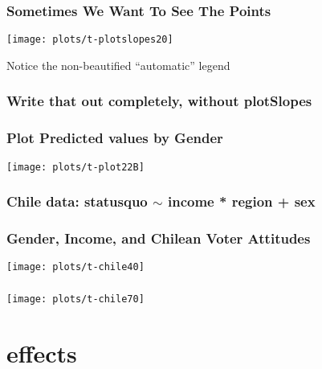 \documentclass[10pt,english]{beamer}
\def\lyxframeend{} %
\def\Sweavesize{\normalsize}
\begin{document}
\begin{frame}
\frametitle{Sometimes We Want To See The Points}


\texttt{[image: plots/t-plotslopes20]}

Notice the non-beautified ``automatic'' legend

\end{frame}

\begin{frame}
\frametitle{Write that out completely, without plotSlopes}




\end{frame}

\begin{frame}[containsverbatim]
\frametitle{Plot Predicted values by Gender}

\texttt{[image: plots/t-plot22B]}

\end{frame}

\begin{frame}[containsverbatim]
\frametitle{Chile data: statusquo $\sim$ income * region + sex}


\def\Sweavesize{\scriptsize}


\end{frame}

\begin{frame}
\frametitle{Gender, Income, and Chilean Voter Attitudes}

\texttt{[image: plots/t-chile40]}

\end{frame}

\begin{frame}
\frametitle{}




\texttt{[image: plots/t-chile70]}

\end{frame}


\lyxframeend{}\section{effects}
\end{document}
